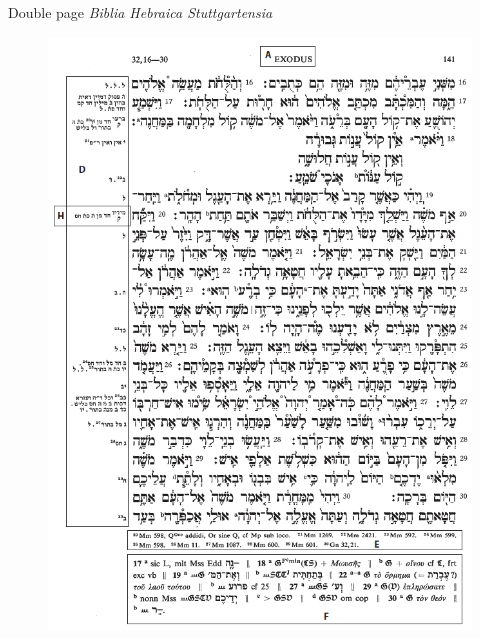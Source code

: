\documentclass[11pt]{beamer}
\begin{document}
\begin{frame}{Double page \textit{Biblia Hebraica Stuttgartensia}}
\begin{minipage}{.45\textwidth}
\begin{figure}
        \centering
        \includegraphics[width=1\linewidth]{img/BHSrecto.png}
    \end{figure}
\end{minipage}
\end{frame}
\end{document}
